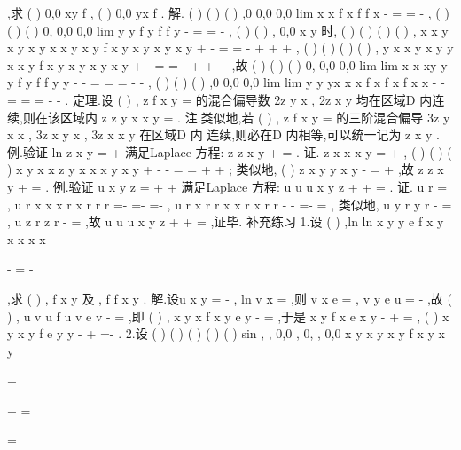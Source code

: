 ,求
(
)
0,0
xy
f
,
(
)
0,0
yx
f
. 
解.
(
)
(
)
(
)
,0
0,0
0,0
lim
x
x
f x
f
f
x
\to 
-
=
=
-
,
(
)
(
)
(
)
0,
0,0
0,0
lim
y
y
f
y
f
f
y
\to 
-
=
=
-
, 
(
)
(
)
,
0,0
x y \neq 
时,
(
)
(
)
(
)
(
)
,
x
x y x
y
x y
x
x y
x y
f
x y
x
y
x
y
x
y
+
-
\cdots 
=
=
-
+
+
+
, 
(
)
(
)
(
)
(
)
,
y
x
x
y
x y
y
x
x y
f
x y
x
y
x
y
x
y
+
-
\cdots 
=
=
-
+
+
+
,故 
(
)
(
)
(
)
0,
0,0
0,0
lim
lim
x
x
xy
y
y
f
y
f
f
y
y
\to 
\to 
-
-
=
=
=
-
-
, 
(
)
(
)
(
)
,0
0,0
0,0
lim
lim
y
y
yx
x
x
f
x
f
x
f
x
x
\to 
\to 
-
-
=
=
=
-
-
. 
\textcolor{lyred}{定理}.设
(
)
,
z
f x y
=
的混合偏导数
2z
y x
\partial 
\partial \partial ,
2z
x y
\partial 
\partial \partial 均在区域D 内连续,则在该区域内 
z
z
y x
x y
\partial 
\partial 
=
\partial \partial 
\partial \partial . 
\textcolor{lyred}{注}.类似地,若
(
)
,
z
f x y
=
的三阶混合偏导
3z
y x x
\partial 
\partial \partial \partial ,
3z
x y x
\partial 
\partial \partial \partial ,
3z
x x y
\partial 
\partial \partial \partial 在区域D 内 
连续,则必在D 内相等,可以统一记为
z
x
y
\partial 
\partial 
\partial . 
\textcolor{lyred}{例}.验证
ln
z
x
y
=
+
满足\textcolor{lyred}{Laplace 方程}:
z
z
x
y
\partial 
\partial 
+
=
\partial 
\partial 
. 
证.
z
x
x
x
y
\partial =
\partial 
+
,
(
)
(
)
(
)
x
y
x
x
z
y
x
x
x
y
x
y
\cdots 
+
-\cdots 
\partial 
-
=
=
\partial 
+
+
; 
类似地,
(
)
z
x
y
y
x
y
\partial 
-
=
\partial 
+
,故
z
z
x
y
\partial 
\partial 
+
=
\partial 
\partial 
. 
\textcolor{lyred}{例}.验证
u
x
y
z
=
+
+
满足\textcolor{lyred}{Laplace 方程}:
u
u
u
x
y
z
\partial 
\partial 
\partial 
+
+
=
\partial 
\partial 
\partial 
. 
证.
u
r
=
,
u
r
x
x
x
r
x
r
r
r
\partial 
\partial 
=-
=-
\cdots 
=-
\partial 
\partial 
,
u
r
x
r
r
x
x
r
x
r
r
\partial 
-\cdots 
\cdots \partial \partial 
-
=-
=
\partial 
, 
类似地,
u
y
r
y
r
\partial 
-
=
\partial 
,
u
z
r
z
r
\partial 
-
=
\partial 
,故
u
u
u
x
y
z
\partial 
\partial 
\partial 
+
+
=
\partial 
\partial 
\partial 
,证毕. 
\textcolor{lyred}{补充练习 }
1.设
(
)
,ln
ln
x y
y
e
f x
y
x
x
x
x
-


-
=
-




,求
(
)
,
f x y 及
,
f
f
x
y
\partial 
\partial 
\partial 
\partial . 
解.设u
x
y
=
-
,
ln
v
x
=
,则
v
x
e
=
,
v
y
e
u
=
-
,故
(
)
,
u
v
u
f u v
e
v
-
=
,即 
(
)
,
x
y
x
f x y
e
y
-
=
,于是
x
y
f
x e
x
y
-
\partial 
+
=
\partial 
,
(
)
x
y
x
y
f
e
y
y
-
+
\partial 
=-
\partial 
. 
2.设
(
)
(
)
(
)
(
)
(
)
sin
,
,
0,0
,
0,
,
0,0
x
y
x y
x
y
f x y
x y

+
\neq 

+
=

=

